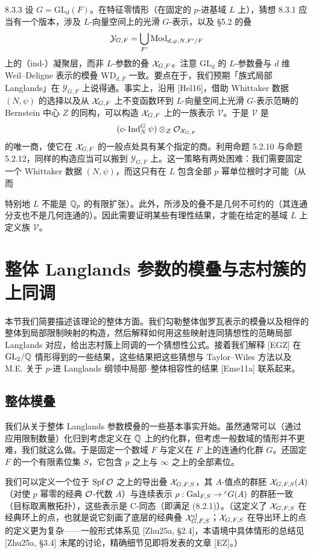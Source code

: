 \begin{rem}{8.3.3}\label{rem:a4-8-3-3}
设 $G=\mathrm{GL}_d(F)$。在特征零情形（在固定的 $p$-进基域 $L$ 上），猜想 8.3.1 应当有一个版本，涉及 $L$-向量空间上的光滑 $G$-表示，以及 §5.2 的叠
\[
\mathcal Y_{G,F}=\bigcup_{F'}\operatorname{Mod}_{d,\varphi,N,F'/F}
\]
上的（ind-）凝聚层，而非 $L$-参数的叠 $\mathcal{X}_{G,F}$。注意 $\mathrm{GL}_d$ 的 $L$-参数叠与 $d$ 维 Weil--Deligne 表示的模叠 $\mathrm{WD}_{d,F}$ 一致。要点在于，我们预期「族式局部 Langlands」在 $\mathcal Y_{G,F}$ 上说得通。事实上，沿用 [Hel16]，借助 Whittaker 数据 $(N,\psi)$ 的选择以及从 $\mathcal{X}_{G,F}$ 上不变函数环到 $L$-向量空间上光滑 $G$-表示范畴的 Bernstein 中心 $Z$ 的同构，可以构造 $\mathcal{X}_{G,F}$ 上的一族表示 $\mathcal V$。于是 $\mathcal V$ 是
\[
(c\text{-}\operatorname{Ind}_N^G\psi)\otimes_{\mathcal{Z}}\mathcal{O}_{\mathcal{X}_{G,F}}
\]
的唯一商，使它在 $\mathcal{X}_{G,F}$ 的一般点处具有某个指定的商。利用命题 5.2.10 与命题 5.2.12，同样的构造应当可以搬到 $\mathcal Y_{G,F}$ 上。这一策略有两处困难：我们需要固定一个 Whittaker 数据 $(N,\psi)$，而这只有在 $L$ 包含全部 $p$ 幂单位根时才可能（从而

特别地 $L$ 不能是 $\mathbb{Q}_p$ 的有限扩张）。此外，所涉及的叠不是几何不可约的（其连通分支也不是几何连通的）。因此需要证明某些有理性结果，才能在给定的基域 $L$ 上定义族 $\mathcal V$。
\end{rem}

\section{整体 Langlands 参数的模叠与志村簇的上同调}

本节我们简要描述该理论的整体方面。我们勾勒整体伽罗瓦表示的模叠以及相伴的整体到局部限制映射的构造，然后解释如何用这些映射连同猜想性的范畴局部 Langlands 对应，给出志村簇上同调的一个猜想性公式。接着我们解释 [EGZ] 在 $\mathrm{GL}_2/\mathbb{Q}$ 情形得到的一些结果，这些结果把这些猜想与 Taylor--Wiles 方法以及 M.E. 关于 $p$-进 Langlands 纲领中局部--整体相容性的结果 [Eme11a] 联系起来。

\subsection{整体模叠}
我们从关于整体 Langlands 参数模叠的一些基本事实开始。虽然通常可以（通过应用限制数量）化归到考虑定义在 $\mathbb{Q}$ 上的约化群，但考虑一般数域的情形并不更难，我们就这么做。于是固定一个数域 $F$ 与定义在 $F$ 上的连通约化群 $G$。还固定 $F$ 的一个有限素位集 $S$，它包含 $p$ 之上与 $\infty$ 之上的全部素位。

我们可以定义一个位于 $\operatorname{Spf}\mathcal{O}$ 之上的导出叠 $\mathcal{X}_{G,F,S}$，其 $A$-值点的群胚 $\mathcal{X}_{G,F,S}(A)$（对使 $p$ 幂零的经典 $\mathcal{O}$-代数 $A$）与连续表示 $\rho:\operatorname{Gal}_{F,S}\to{}^cG(A)$ 的群胚一致（目标取离散拓扑），这些表示是 C-同态（即满足 (8.2.1)）。（这定义了 $\mathcal{X}_{G,F,S}$ 在经典环上的点，也就是说它刻画了底层的经典叠 $\mathcal{X}^{\mathrm{cl}}_{G,F,S}$；$\mathcal{X}_{G,F,S}$ 在导出环上的点的定义更为复杂——一般形式体系见 [Zhu25a, §2.4]，本语境中具体情形的总结见 [Zhu25a, §3.4] 末尾的讨论，精确细节见即将发表的文章 [EZ]。）

